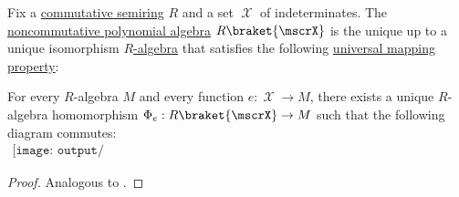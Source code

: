 \begin{theorem}\label{thm:noncommutative_polynomial_algebra_universal_property}
  Fix a \hyperref[def:semiring/commutative]{commutative semiring} \( R \) and a set \( \mscrX \) of indeterminates. The \hyperref[def:noncommutative_polynomial_algebra]{noncommutative polynomial algebra} \( R\braket{\mscrX} \) is the unique up to a unique isomorphism \hyperref[def:algebra_over_semiring]{\( R \)-algebra} that satisfies the following \hyperref[rem:universal_mapping_property]{universal mapping property}:
  \begin{displayquote}
    For every \( R \)-algebra \( M \) and every function \( e: \mscrX \to M \), there exists a unique \( R \)-algebra homomorphism \( \Phi_e: R\braket{\mscrX} \to M \) such that the following diagram commutes:
    \begin{equation}\label{eq:thm:noncommutative_polynomial_algebra_universal_property/diagram}
      \begin{aligned}
        \texttt{[image: output/thm\_\_noncommutative\_polynomial\_algebra\_universal\_property]}
      \end{aligned}
    \end{equation}
  \end{displayquote}
\end{theorem}
\begin{proof}
  Analogous to .
\end{proof}
